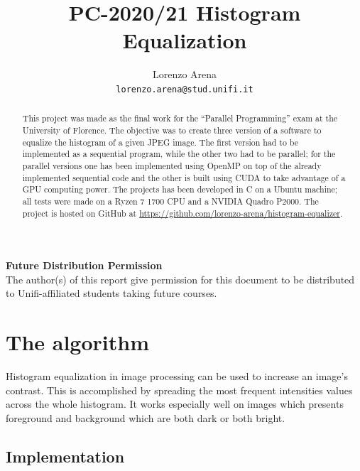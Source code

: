 \documentclass[10pt,twocolumn,letterpaper]{article}
\begin{document}
\title{PC-2020/21 Histogram Equalization}

\author{Lorenzo Arena\\
{\tt\small lorenzo.arena@stud.unifi.it}
}

\maketitle
\thispagestyle{empty}

\begin{abstract}
    This project was made as the final work for the “Parallel Programming”
    exam at the University of Florence. The objective was to create three
    version of a software to equalize the histogram of a given JPEG image.
    The first version had to be implemented as a sequential program, while
    the other two had to be parallel; for the parallel versions one has
    been implemented using OpenMP on top of the already implemented sequential
    code and the other is built using CUDA to take advantage of a GPU computing
    power. The projects has been developed in C on a Ubuntu machine; all
    tests were made on a Ryzen 7 1700 CPU and a NVIDIA Quadro P2000. The project
    is hosted on GitHub at \url{https://github.com/lorenzo-arena/histogram-equalizer}.
 \end{abstract}

\noindent\large\textbf{Future Distribution Permission}\\
\indent The author(s) of this report give permission for this document to be
        distributed to Unifi-affiliated students taking future courses.

\section{The algorithm}

Histogram equalization in image processing can be used to increase an image's
contrast. This is accomplished by spreading the most frequent intensities
values across the whole histogram. It works especially well on images which
presents foreground and background which are both dark or both bright.

\subsection{Implementation}
\end{document}
